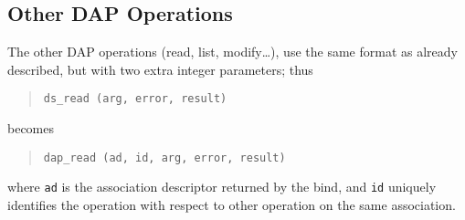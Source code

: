 \subsection {Other DAP Operations}

The other DAP operations (read, list, modify\ldots), use the same format
as already described, but with two extra integer parameters; thus
\begin{quote}\small\begin{verbatim}
ds_read (arg, error, result)
\end{verbatim}\end{quote}
becomes
\begin{quote}\small\begin{verbatim}
dap_read (ad, id, arg, error, result)
\end{verbatim}\end{quote}
where \verb"ad" is the association descriptor returned by the bind, and 
\verb"id" uniquely identifies the operation with respect to other
operation on the same association.


